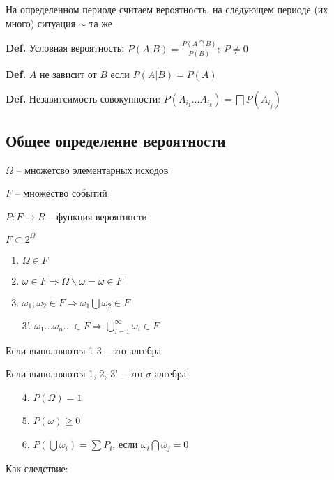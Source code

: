 \documentclass[14pt, letter paper]{article}
\begin{document}
На определенном периоде считаем вероятность, на следующем периоде (их много) ситуация $\sim$ та же

\textbf{Def.} Условная вероятность: $P(A|B) = \frac{P(A \bigcap B)}{P(B)};\ P \neq 0$

\textbf{Def.} $A$ не зависит от $B$ если $P(A|B) = P(A)$

\textbf{Def.} Незавитсимость совокупности: $P(A_{i_1} \ldots A_{i_k}) = \bigsqcap P(A_{i_j})$

\vspace{5mm}

\begin{center}
    \subsection*{Общее определение вероятности}
\end{center} 

$\Omega$ -- множетсво элементарных исходов

$F$ -- множество событий

$P : F \rightarrow R$ -- функция вероятности

$F \subset 2^\Omega$

\begin{enumerate}
    \item $\Omega \in F$
    
    \item $\omega \in F \Rightarrow \Omega \backslash \omega = \overline{\omega} \in F$
    
    \item $\omega_1, \omega_2 \in F \Rightarrow \omega_1 \bigcup \omega_2 \in F$

    \item[3'.] $\omega_1 \ldots \omega_n \ldots \in F \Rightarrow \bigcup\limits_{i=1}^\infty \omega_i \in F$
\end{enumerate}

Если выполняются 1-3 -- это алгебра

Если выполняются 1, 2, 3' -- это $\sigma$-алгебра

\begin{enumerate}
    \item[4.] $P(\Omega) = 1$
    \item[5.] $P(\omega) \geq 0$
    \item[6.] $P(\bigcup \omega_i) = \sum P_i$, если $\omega_i \bigcap \omega_j = 0$
\end{enumerate}

Как следствие:
\end{document}
